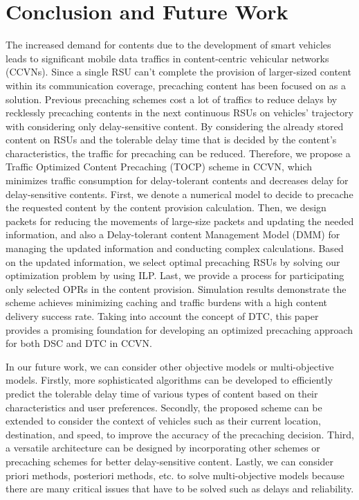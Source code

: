 \documentclass{ieeeaccess}
\begin{document}
\section{Conclusion and Future Work} \label{sec.c}
The increased demand for contents due to the development of smart vehicles leads to significant mobile data traffics in content-centric vehicular networks (CCVNs).
Since a single RSU can't complete the provision of larger-sized content within its communication coverage, precaching content has been focused on as a solution.
Previous precaching schemes cost a lot of traffics to reduce delays by recklessly precaching contents in the next continuous RSUs on vehicles' trajectory with considering only delay-sensitive content.
By considering the already stored content on RSUs and the tolerable delay time that is decided by the content's characteristics, the traffic for precaching can be reduced.
Therefore, we propose a Traffic Optimized Content Precaching (TOCP) scheme in CCVN, which minimizes traffic consumption for delay-tolerant contents and decreases delay for delay-sensitive contents.
First, we denote a numerical model to decide to precache the requested content by the content provision calculation.
Then, we design packets for reducing the movements of large-size packets and updating the needed information, and also a Delay-tolerant content Management Model (DMM) for managing the updated information and conducting complex calculations.
Based on the updated information, we select optimal precaching RSUs by solving our optimization problem by using ILP.
Last, we provide a process for participating only selected OPRs in the content provision.
Simulation results demonstrate the scheme achieves minimizing caching and traffic burdens with a high content delivery success rate.
Taking into account the concept of DTC, this paper provides a promising foundation for developing an optimized precaching approach for both DSC and DTC in CCVN.

In our future work, we can consider other objective models or multi-objective models.
Firstly, more sophisticated algorithms can be developed to efficiently predict the tolerable delay time of various types of content based on their characteristics and user preferences.
Secondly, the proposed scheme can be extended to consider the context of vehicles such as their current location, destination, and speed, to improve the accuracy of the precaching decision.
Third, a versatile architecture can be designed by incorporating other schemes or precaching schemes for better delay-sensitive content.
Lastly, we can consider priori methods, posteriori methods, etc. to solve multi-objective models because there are many critical issues that have to be solved such as delays and reliability.
\end{document}
